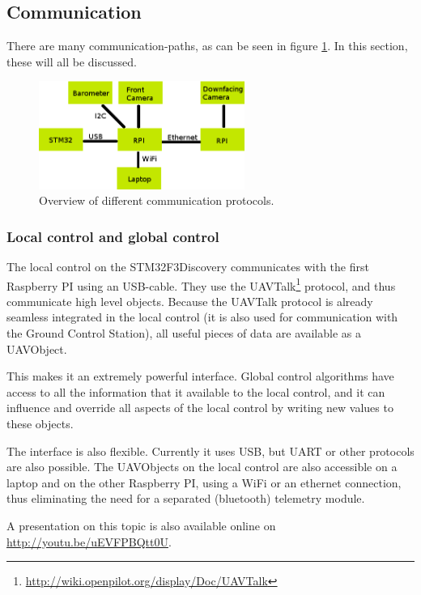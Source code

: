 \documentclass[11pt, a4paper, onecolumn, oneside, parskip=half]{scrartcl}
\begin{document}
\subsection{Communication}
\label{sec:arch:comm}
There are many communication-paths, as can be seen in figure \ref{fig:communication}. In this section, these will all be discussed.

\begin{figure}[ht]
\centering
\includegraphics[width=0.6\textwidth]{hwdesign2}
\caption{Overview of different communication protocols.}
\label{fig:communication}
\end{figure}

\subsubsection{Local control and global control}
\label{sec:arch:comm:localglobal}
The local control on the STM32F3Discovery communicates with the first Raspberry PI using an USB-cable. They use the UAVTalk\footnote{\url{http://wiki.openpilot.org/display/Doc/UAVTalk}} protocol, and thus communicate high level objects. Because the UAVTalk protocol is already seamless integrated in the local control (it is also used for communication with the Ground Control Station), all useful pieces of data are available as a UAVObject.

This makes it an extremely powerful interface. Global control algorithms have access to all the information that it available to the local control, and it can influence and override all aspects of the local control by writing new values to these objects.

The interface is also flexible. Currently it uses USB, but UART or other protocols are also possible. The UAVObjects on the local control are also accessible on a laptop and on the other Raspberry PI, using a WiFi or an ethernet connection, thus eliminating the need for a separated (bluetooth) telemetry module.

A presentation on this topic is also available online on \url{http://youtu.be/uEVFPBQtt0U}.
\end{document}

